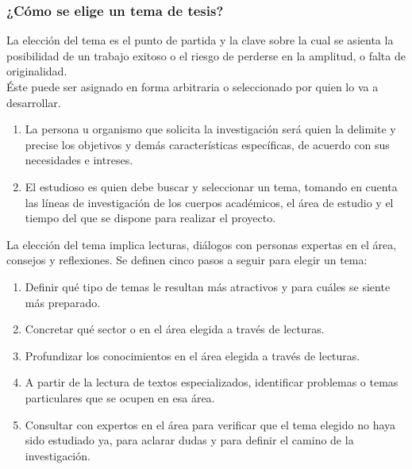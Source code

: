 \documentclass[
	11pt, %
]{beamer}
\begin{document}
\begin{frame}
  \frametitle{¿Cómo se elige un tema de tesis?}
  \bigskip %

  La elección del tema es el punto de partida y la clave sobre la cual se asienta la posibilidad de un trabajo exitoso o el riesgo de perderse en la amplitud, o falta de originalidad.\\
  \bigskip %
  Éste puede ser asignado en forma arbitraria o seleccionado por quien lo va a desarrollar.\\
  \bigskip %
  \begin{enumerate}
  \item La persona u organismo que solicita la investigación será quien la delimite y precise los objetivos y demás características específicas, de acuerdo con sus necesidades e intreses.
  \item El estudioso es quien debe buscar y seleccionar un tema, tomando en cuenta las líneas de investigación de los cuerpos académicos, el área de estudio y el tiempo del que se dispone para realizar el proyecto.
  \end{enumerate}
  
\end{frame}

\begin{frame}
  
  La elección del tema implica lecturas, diálogos con personas expertas en el área, consejos y reflexiones. Se definen cinco pasos a seguir para elegir un tema:
  \bigskip %
  \begin{enumerate}
  \item Definir qué tipo de temas le resultan más atractivos y para cuáles se siente más preparado.
  \item Concretar qué sector o en el área elegida a través de lecturas.
  \item Profundizar los conocimientos en el área elegida a través de lecturas.
  \item A partir de la lectura de textos especializados, identificar problemas o temas particulares que se ocupen en esa área.
  \item Consultar con expertos en el área para verificar que el tema elegido no haya sido estudiado ya, para aclarar dudas y para definir el camino de la investigación.
  \end{enumerate}
  
\end{frame}
\end{document}
